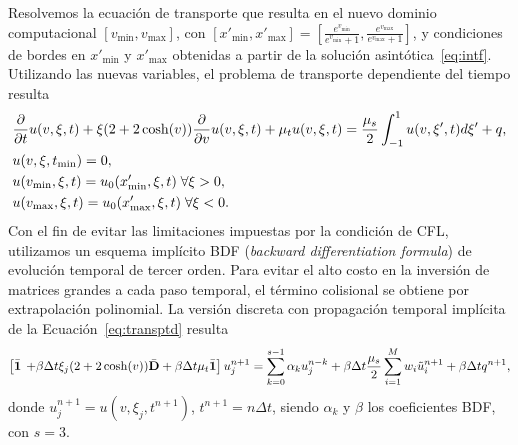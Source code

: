 Resolvemos la ecuación de transporte que resulta en el nuevo dominio computacional
\noindent $[v_{\text{min}},v_{\text{max}}]$, con 
$[x'_{\text{min}},x'_{\text{max}}]=[\frac{e^{v_{\text{min}}}}{e^{v_{\text{min}}}+1},
\frac{e^{v_{\text{max}}}}{e^{v_{\text{max}}}+1}]$, 
y condiciones de bordes en $x'_{\text{min}}$ y $x'_{\text{max}}$ 
obtenidas a partir de la solución asintótica~\eqref{eq:intf}.
 Utilizando las nuevas variables, 
el problema de transporte dependiente del tiempo resulta 
\begin{equation}
\begin{split}
&\frac{\partial}{\partial t}u(v,\xi,t)+\xi(2+2\cosh(v)) \frac{\partial}{\partial v}u(v,\xi,t)+\mu_tu(v,\xi,t)=\frac{\mu_s}{2} \int_{-1}^{1} u(v,\xi',t) d\xi'+q, \\
&u(v,\xi,t_{\text{min}})=0,\\
&u(v_{\text{min}},\xi,t)=u_{0}(x'_{\text{min}},\xi,t) \; \forall \xi>0,\\
&u(v_{\text{max}},\xi,t)=u_{0}(x'_{\text{max}},\xi,t) \; \forall \xi<0.
\end{split}
\label{eq:transptd}
\end{equation}
Con el fin de evitar las
limitaciones impuestas por la condición de CFL, utilizamos un 
esquema implícito BDF ({\em backward differentiation formula}) de evolución temporal de tercer orden. 
Para evitar el alto costo en la inversión de matrices grandes a 
cada paso 
temporal, el término 
colisional se obtiene por extrapolación polinomial. La versión discreta con propagación temporal 
implícita de la Ecuación~\eqref{eq:transptd} resulta
\begin{equation*}
\begin{aligned}
 \left[ \bar{\mathbf{1}} \right.  \left.+ \beta\Delta t\xi_j (2+2\cosh(v)) \bar{\mathbf{D}} + \beta\Delta t \mu_t \bar{\mathbf{1}} \right]  
 u^{n+1}_j  = \sum_{k=0}^{s-1}\alpha_k u_j^{n-k} + \beta\Delta t \frac{\mu_s}{2}
 \sum_{i=1}^{M} w_i \tilde{u}_i^{n+1} + \beta\Delta t q^{n+1},
\end{aligned}
\label{eq:transptd1disc}
\end{equation*}
donde $u^{n+1}_j=u(v,\xi_j,t^{n+1})$, $t^{n+1}=n\Delta t$, siendo $\alpha_k$ y $\beta$ 
los coeficientes BDF, con $s=3$. 
